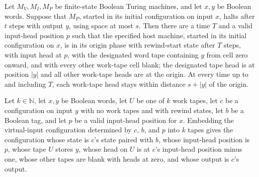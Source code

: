 \begin{theorem}
\label{Complexity.b2b_setup_capture}
\leanok
{}
Let $M_V,M_I,M_P$ be finite-state Boolean Turing machines, and let $x,y$ be Boolean
words. Suppose that $M_P$, started in its initial configuration on input $x$, halts
after $t$ steps with output $y$, using space at most $s$. Then there are a time $T$ and
a valid input-head position $p$ such that the specified host machine, started in its
initial configuration on $x$, is in its origin phase with rewind-start state after $T$
steps, with input head at $p$, with the designated word tape containing $y$ from cell
zero onward, and with every other work-tape cell blank; the designated tape head is at
position $|y|$ and all other work-tape heads are at the origin. At every time up to and
including $T$, each work-tape head stays within distance $s+|y|$ of the origin.
\end{theorem}

\begin{theorem}
\label{Complexity.b2b_origin_shape}
\leanok
{}
Let $k\in\mathbb{N}$, let $x,y$ be Boolean words, let $U$ be one of $k$ work tapes, let
$c$ be a configuration on input $y$ with no work tapes and with rewind states, let $b$
be a Boolean tag, and let $p$ be a valid input-head position for $x$. Embedding the
virtual-input configuration determined by $c$, $b$, and $p$ into $k$ tapes gives the
configuration whose state is $c$'s state paired with $b$, whose input-head position is
$p$, whose tape $U$ stores $y$, whose head on $U$ is at $c$'s input-head position minus
one, whose other tapes are blank with heads at zero, and whose output is $c$'s output.
\end{theorem}

